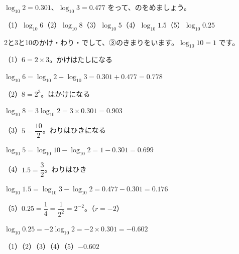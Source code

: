 \begin{reidai}
$\log_{10}2=0.301$、$\log_{10}3=0.477$ をって、のをめましょう。\par
（1）\nobreak $\log_{10}6$\quad（2）\nobreak $\log_{10}8$\quad（3）\nobreak $\log_{10}5$\quad（4）\nobreak $\log_{10}1.5$\quad（5）\nobreak $\log_{10}0.25$\par
\kangaekata 2と3と10のかけ・わり・でして、③のきまりをいます。$\log_{10}10=1$ です。\par
\shiki（1）\nobreak $6=2\times3$。かけはたしになる\par
\hspace*{4.6\zw}$\log_{10}6=\log_{10}2+\log_{10}3=0.301+0.477=0.778$\par
\hspace*{2.6\zw}（2）\nobreak $8=2^3$。はかけになる\par
\hspace*{4.6\zw}$\log_{10}8=3\log_{10}2=3\times0.301=0.903$\par
\hspace*{2.6\zw}（3）\nobreak $5=\dfrac{10}{2}$。わりはひきになる\par
\hspace*{4.6\zw}$\log_{10}5=\log_{10}10-\log_{10}2=1-0.301=0.699$\par
\hspace*{2.6\zw}（4）\nobreak $1.5=\dfrac{3}{2}$。わりはひき\par
\hspace*{4.6\zw}$\log_{10}1.5=\log_{10}3-\log_{10}2=0.477-0.301=0.176$\par
\hspace*{2.6\zw}（5）\nobreak $0.25=\dfrac{1}{4}=\dfrac{1}{2^2}=2^{-2}$。（$r=-2$）\par
\hspace*{4.6\zw}$\log_{10}0.25=-2\log_{10}2=-2\times0.301=-0.602$\par
\kotae（1）\quad（2）\quad（3）\quad（4）\quad（5）\nobreak $-0.602$
\end{reidai}

